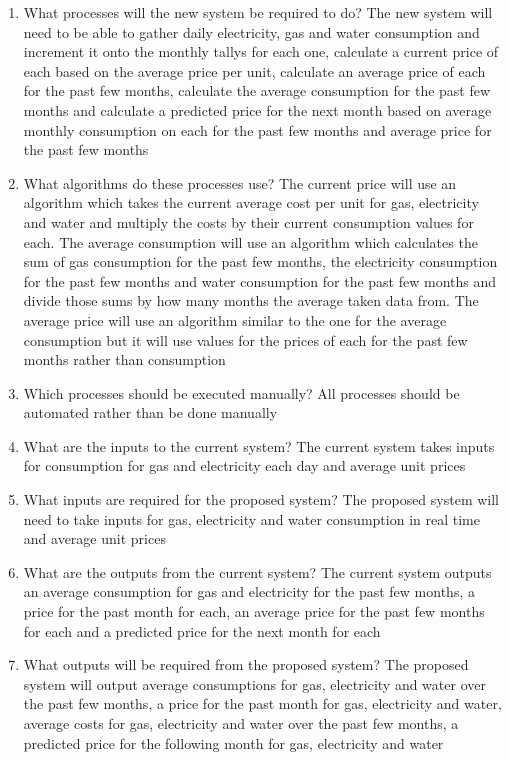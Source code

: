 \begin{enumerate}
	\item What processes will the new system be required to do?
The new system will need to be able to gather daily electricity, gas and water consumption and increment it onto the monthly tallys for each one, calculate a current price of each based on the average price per unit, calculate an average price of each for the past few months, calculate the average consumption for the past few months and calculate a predicted price for the next month based on average monthly consumption on each for the past few months and average price for the past few months


	\item What algorithms do these processes use?
The current price will use an algorithm which takes the current average cost per unit for gas, electricity and water and multiply the costs by their current consumption values for each.
The average consumption will use an algorithm which calculates the sum of gas consumption for the past few months, the electricity consumption for the past few months and water consumption for the past few months and divide those sums by how many months the average taken data from. 
The average price will use an algorithm similar to the one for the average consumption but it will use values for the prices of each for the past few months rather than consumption

	\item Which processes should be executed manually?
All processes should be automated rather than be done manually

	\item What are the inputs to the current system?
The current system takes inputs for consumption for gas and electricity each day and average unit prices

	\item What inputs are required for the proposed system?
The proposed system will need to take inputs for gas, electricity and water consumption in real time and average unit prices

	\item What are the outputs from the current system?
The current system outputs an average consumption for gas and electricity for the past few months, a price for the past month for each, an average price for the past few months for each and a predicted price for the next month for each

	\item What outputs will be required from the proposed system?
The proposed system will output average consumptions for gas, electricity and water over the past few months, a price for the past month for gas, electricity and water, average costs for gas, electricity and water over the past few months, a predicted price for the following month for gas, electricity and water

\end{enumerate}

